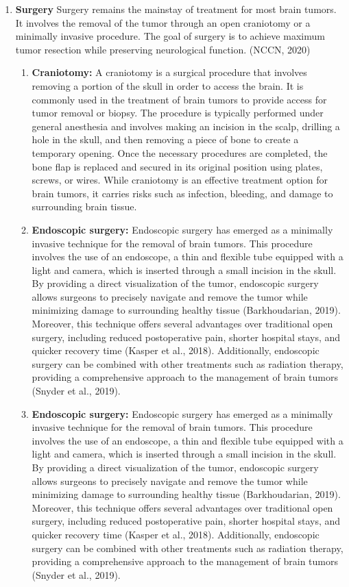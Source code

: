 \documentclass[12pt,oneside]{report}
\begin{document}
\begin{enumerate}
\item \textbf{Surgery}
Surgery remains the mainstay of treatment for most brain tumors. It involves the removal of the tumor through an open craniotomy or a minimally invasive procedure. The goal of surgery is to achieve maximum tumor resection while preserving neurological function. (NCCN, 2020)

\begin{enumerate}
\item \textbf{Craniotomy:}
A craniotomy is a surgical procedure that involves removing a portion of the skull in order to access the brain. It is commonly used in the treatment of brain tumors to provide access for tumor removal or biopsy. The procedure is typically performed under general anesthesia and involves making an incision in the scalp, drilling a hole in the skull, and then removing a piece of bone to create a temporary opening. Once the necessary procedures are completed, the bone flap is replaced and secured in its original position using plates, screws, or wires. While craniotomy is an effective treatment option for brain tumors, it carries risks such as infection, bleeding, and damage to surrounding brain tissue.

\item \textbf{Endoscopic surgery:}
Endoscopic surgery has emerged as a minimally invasive technique for the removal of brain tumors. This procedure involves the use of an endoscope, a thin and flexible tube equipped with a light and camera, which is inserted through a small incision in the skull. By providing a direct visualization of the tumor, endoscopic surgery allows surgeons to precisely navigate and remove the tumor while minimizing damage to surrounding healthy tissue (Barkhoudarian, 2019). Moreover, this technique offers several advantages over traditional open surgery, including reduced postoperative pain, shorter hospital stays, and quicker recovery time (Kasper et al., 2018). Additionally, endoscopic surgery can be combined with other treatments such as radiation therapy, providing a comprehensive approach to the management of brain tumors (Snyder et al., 2019).

\item \textbf{Endoscopic surgery:}
Endoscopic surgery has emerged as a minimally invasive technique for the removal of brain tumors. This procedure involves the use of an endoscope, a thin and flexible tube equipped with a light and camera, which is inserted through a small incision in the skull. By providing a direct visualization of the tumor, endoscopic surgery allows surgeons to precisely navigate and remove the tumor while minimizing damage to surrounding healthy tissue (Barkhoudarian, 2019). Moreover, this technique offers several advantages over traditional open surgery, including reduced postoperative pain, shorter hospital stays, and quicker recovery time (Kasper et al., 2018). Additionally, endoscopic surgery can be combined with other treatments such as radiation therapy, providing a comprehensive approach to the management of brain tumors (Snyder et al., 2019).


\end{enumerate}
\end{enumerate}
\end{document}

